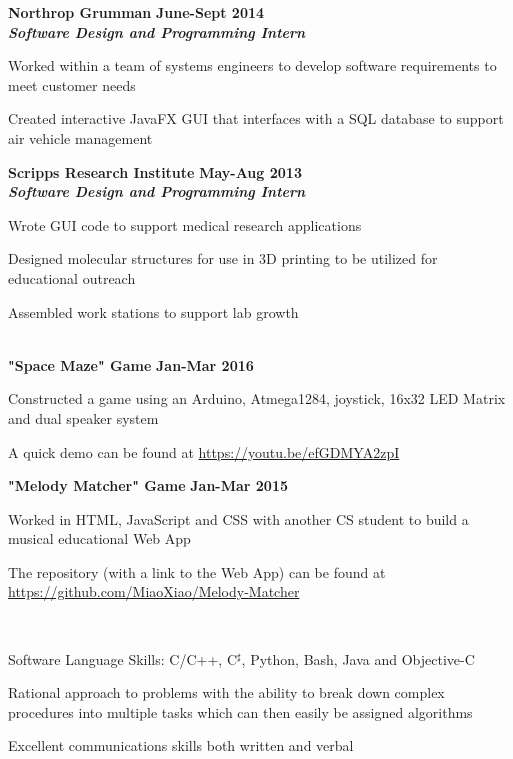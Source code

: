 \documentclass[10pt]{article}
\newcommand{\thing}[1][]{\item #1}
\newcommand{\sectionheader}[1]{
    \vspace{3pt}
    \StrSplit{#1}{3}{\firstpart}{\lastpart} %
    \textbf{\LARGE
        \firstpart
        \lastpart
    }\\[5pt]
}
\newcommand{\dates}[2]{
    \textbf{#1-#2}
}
\begin{document}
    \textbf{\large Northrop Grumman} \hfill \dates{June}{Sept 2014}\\
    \textit{\textbf{Software Design and Programming Intern}}
    \begin{things}
        \thing Worked within a team of systems engineers to develop
                software requirements to meet customer needs
        \thing Created interactive JavaFX GUI that interfaces with a
                SQL database to support air vehicle management
    \end{things}


    \textbf{\large Scripps Research Institute} \hfill \dates{May}{Aug 2013}\\
    \textit{\textbf{Software Design and Programming Intern}}
    \begin{things}
        \thing Wrote GUI code to support medical research applications
        \thing Designed molecular structures for use in 3D printing
                to be utilized for educational outreach
        \thing Assembled work stations to support lab growth
    \end{things}

    \sectionheader{Projects}
    \textbf{\large "Space Maze" Game} \hfill \dates{Jan}{Mar 2016}
    \begin{things}
        \thing Constructed a game using an Arduino, Atmega1284,
                joystick, 16x32 LED Matrix and dual speaker system
        \thing A quick demo can be found at \url{https://youtu.be/efGDMYA2zpI}
    \end{things}

    \textbf{\large "Melody Matcher" Game} \hfill \dates{Jan}{Mar 2015}
    \begin{things}
        \thing Worked in HTML, JavaScript and CSS with another
                CS student to build a musical educational Web App
        \thing The repository (with a link to the Web App) can be
                found at \url{https://github.com/MiaoXiao/Melody-Matcher}
    \end{things}

    \sectionheader{Skills}
    \vspace{-15pt} %
    \begin{things}
        \thing Software Language Skills: C/C++, C$^\sharp$, Python, Bash,
                Java and Objective-C
        \thing Rational approach to problems with the ability to
                break down complex procedures into multiple tasks
                which can then easily be assigned algorithms
        \thing Excellent communications skills both written and verbal
    \end{things}
\end{document}
